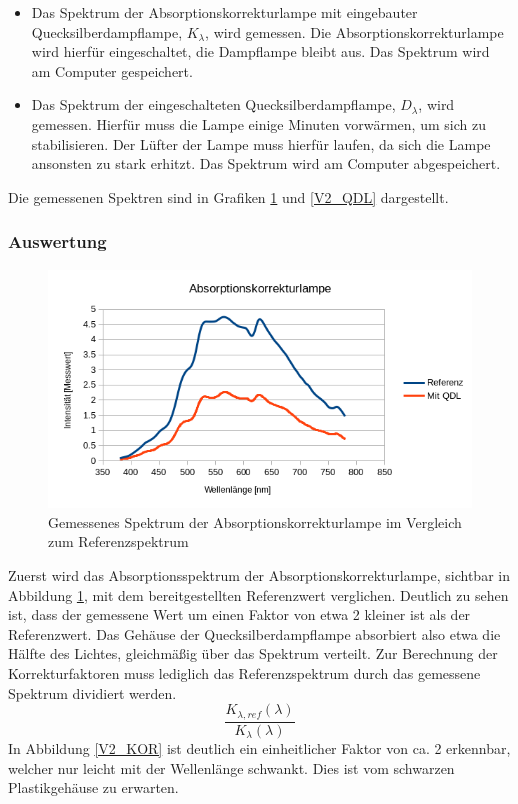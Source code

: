 \begin{itemize}
\item Das Spektrum der Absorptionskorrekturlampe mit eingebauter Quecksilberdampflampe, $K_\lambda$, wird gemessen. Die Absorptionskorrekturlampe wird hierfür eingeschaltet, die Dampflampe bleibt aus. Das Spektrum wird am Computer gespeichert.
\item Das Spektrum der eingeschalteten Quecksilberdampflampe, $D_\lambda$, wird gemessen. Hierfür muss die Lampe einige Minuten vorwärmen, um sich zu stabilisieren. Der Lüfter der Lampe muss hierfür laufen, da sich die Lampe ansonsten zu stark erhitzt. Das Spektrum wird am Computer abgespeichert.
\end{itemize}
Die gemessenen Spektren sind in Grafiken \ref{V2_AKL} und \ref{V2_QDL} dargestellt.

\subsubsection{Auswertung}

\label{V2_AUSW}

\begin{figure}[h]
	\centering
	\includegraphics[scale=0.8]{Images/V2_AKL.png}
	\caption{Gemessenes Spektrum der Absorptionskorrekturlampe im Vergleich zum Referenzspektrum}
	\label{V2_AKL}
\end{figure}

Zuerst wird das Absorptionsspektrum der Absorptionskorrekturlampe, sichtbar in Abbildung \ref{V2_AKL}, mit dem bereitgestellten Referenzwert verglichen. Deutlich zu sehen ist, dass der gemessene Wert um einen Faktor von etwa 2 kleiner ist als der Referenzwert. Das Gehäuse der Quecksilberdampflampe absorbiert also etwa die Hälfte des Lichtes, gleichmäßig über das Spektrum verteilt.
Zur Berechnung der Korrekturfaktoren muss lediglich das Referenzspektrum durch das gemessene Spektrum dividiert werden.
\begin{equation}
\frac{K_{\lambda,ref}(\lambda)}{K_{\lambda}(\lambda)}
\end{equation}
In Abbildung \ref{V2_KOR} ist deutlich ein einheitlicher Faktor von ca. 2 erkennbar, welcher nur leicht mit der Wellenlänge schwankt. Dies ist vom schwarzen Plastikgehäuse zu erwarten.

